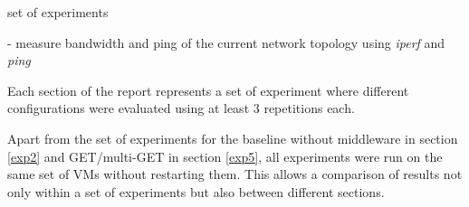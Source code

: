 \documentclass[report.tex]{subfiles}
\begin{document}
\begin{algorithm}
	\scriptsize{
	\ForEach
	{
		set of experiments
	}{
		- measure bandwidth and ping of the current network topology using \emph{iperf} and \emph{ping}
		
	}}
	\caption{Each section of the report represents a set of experiment where different configurations were evaluated using at least 3 repetitions each.}\label{exp-suite-algo}
\end{algorithm}

Apart from the set of experiments for the baseline without middleware in section \ref{exp2} and GET/multi-GET in section \ref{exp5}, all experiments were run on the same set of VMs without restarting them. This allows a comparison of results not only within a set of experiments but also between different sections.
\end{document}
